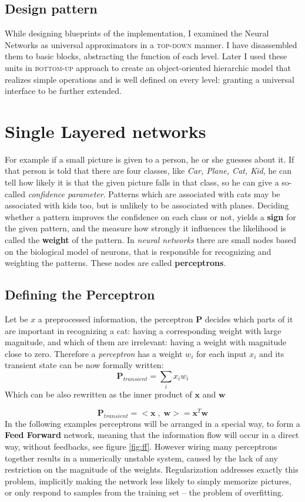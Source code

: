 \subsection{Design pattern} While designing blueprints of the implementation, I examined the Neural Networks as universal approximators in a \textsc{top-down} manner.
I have disassembled them to basic blocks, abstracting the function of each level.
Later I used these units in \textsc{bottom-up} approach to create an object-oriented hierarchic model that realizes simple operations and is well defined on every level: granting a universal interface to be further extended.


\section{Single Layered networks}
For example if a small picture is given to a person, he or she guesses about it. If that person is told that there are four classes, 
like \emph{Car, Plane, Cat, Kid}, he can tell how likely it is that 
the given picture falls in that class, so he can give a so-called \emph{confidence parameter}.
Patterns which are associated with cats may be associated with kids too, but is unlikely to be associated with planes. Deciding whether a pattern improves the confidence on each class or not, yields a \textbf{sign} for the given pattern, and the measure how strongly it influences the likelihood is called the \textbf{weight} of the pattern.
In \emph{neural networks} there are small nodes based on the biological model of neurons, that is responsible for recognizing and weighting the patterns. These nodes are called \textbf{perceptrons}. 

\subsection{Defining the Perceptron} 
Let be $x$ a preprocessed information, the perceptron $\mathbf{P}$ decides which parts of it are important in recognizing a cat: having a corresponding weight with large magnitude, and which of them are irrelevant: having a weight with magnitude close to zero. 
Therefore a \emph{perceptron} has a weight $w_i$ for each input $x_i$ and its transient state can be now formally written:
$$
	\mathbf{P}_{transient}=\sum_i x_i w_i
$$
Which can be also rewritten as the inner product of $\mathbf{x}$ and $\mathbf{w}$

$$
	\mathbf{P}_{transient}= <\mathbf{x} \;,\; \mathbf{w}>=\mathbf{x}^T\mathbf{w}
$$
In the following examples perceptrons will be arranged in a special way, to form a \textbf{Feed Forward} network, meaning that the information flow will occur in a direct way, without feedbacks, see figure \ref{fig:ff}.
However wiring many perceptrons together results in a numerically unstable system, caused by the lack of any restriction on the magnitude of the weights.
Regularization addresses exactly this problem, implicitly making the network less likely to simply memorize pictures, or only respond to samples from the training set -- the problem of overfitting.

